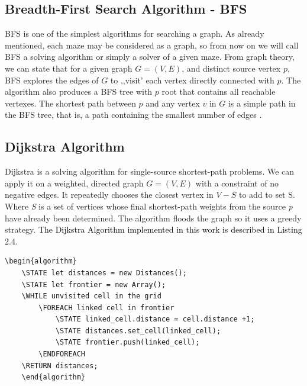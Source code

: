 \subsection{Breadth-First Search Algorithm - BFS}
BFS is one of the simplest algorithms for searching a graph. As already mentioned, each maze may be considered as a graph, so from now on we will call 
BFS  a solving algorithm or simply a solver of a given maze. From graph theory, we can state that for a given graph $ G = ( V, E) $, and distinct source 
vertex $p$, BFS explores the edges of $G$ to ,,visit’ each vertex directly connected with $p$. The algorithm also produces a BFS tree with $p$ root that 
contains all reachable vertexes. The shortest path between $p$ and any vertex $v$ in $G$ is a simple path in the BFS tree, that is, a path containing
the smallest number of edges \cite{Cormen}.
\subsection{Dijkstra Algorithm}
Dijkstra is a solving algorithm for single-source shortest-path problems. We can apply it on a weighted, directed graph $G=(V, E)$ with a constraint of no negative edges. 
It repeatedly chooses the closest vertex in $V-S$ to add to set S. 
Where \textit{S} is a set of vertices whose final shortest-path weights from the source \textit{p} have already been determined.
The algorithm floods the graph so \textcolor{black}{it uses} a greedy strategy. \textcolor{black}{The Dijkstra Algorithm implemented in this work is described in Listing 2.4}.
\newline
\\
\begin{lstlisting}[caption={Pseudocode for a Dijkstra’s algorithm}]
	\begin{algorithm}
	\STATE let distances = new Distances();
	\STATE let frontier = new Array();
	\WHILE unvisited cell in the grid
		\FOREACH linked cell in frontier
			\STATE linked_cell.distance = cell.distance +1;
			\STATE distances.set_cell(linked_cell);
			\STATE frontier.push(linked_cell);
	    \ENDFOREACH
	\RETURN distances;
	\end{algorithm}
	\end{lstlisting}

